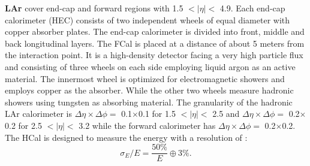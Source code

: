  \textbf{LAr} cover end-cap and forward regions with 1.5 $ < |\eta| < $ 4.9. Each end-cap calorimeter (HEC) consists of two independent wheels of equal diameter with copper absorber plates. The end-cap calorimeter is divided into front, middle and back longitudinal layers. The FCal is placed at a distance of about 5 meters from the interaction point. It is a high-density detector facing a very high particle flux and consisting of three wheels on each side employing liquid argon as an active material. The innermost wheel is optimized for electromagnetic showers and employs copper as the absorber. While the other two wheels measure hadronic showers using tungsten as absorbing material. The granularity of the hadronic LAr calorimeter is $\Delta\eta\times\Delta\phi=$ 0.1$\times$0.1 for 1.5 $ < |\eta|< $ 2.5 and $\Delta\eta\times\Delta\phi=$ 0.2$\times$0.2 for 2.5 $ < |\eta| < $ 3.2 while the forward calorimeter has $\Delta\eta\times\Delta\phi=$ 0.2$\times$0.2.\\
 The HCal is designed to measure the energy with a resolution of \cite{Tile_Perf}:
 \begin{equation}
     \sigma_E/E = \frac{50\%}{E} \oplus 3\%.
 \end{equation}

